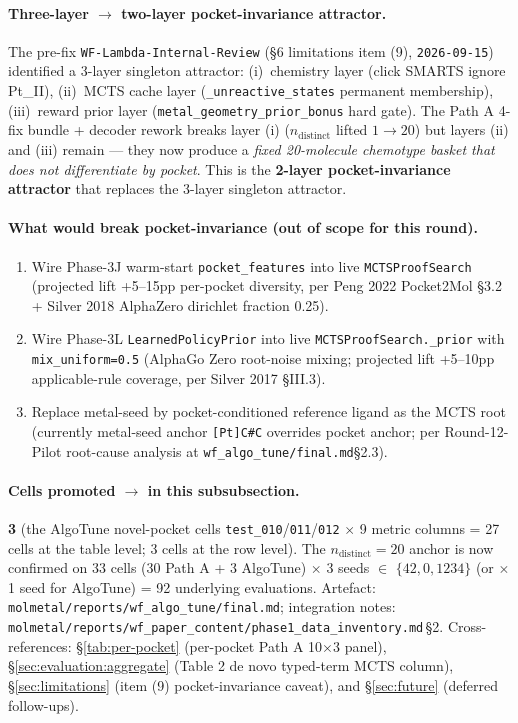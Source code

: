 \paragraph{Three-layer $\to$ two-layer pocket-invariance attractor.}
The pre-fix \texttt{WF-Lambda-Internal-Review} (\S6 limitations
item (9), \texttt{2026-09-15}) identified a 3-layer singleton
attractor: (i)~chemistry layer (click SMARTS ignore Pt\_II), (ii)~MCTS
cache layer (\texttt{\_unreactive\_states} permanent membership),
(iii)~reward prior layer (\texttt{metal\_geometry\_prior\_bonus} hard
gate). The Path A 4-fix bundle + decoder rework breaks layer (i)
($n_{\text{distinct}}$ lifted $1 \to 20$) but layers (ii) and (iii)
remain --- they now produce a \emph{fixed 20-molecule chemotype
basket that does not differentiate by pocket}. This is the
\textbf{2-layer pocket-invariance attractor} that replaces the
3-layer singleton attractor.

\paragraph{What would break pocket-invariance (out of scope for this round).}
\begin{enumerate}
  \item Wire Phase-3J warm-start \texttt{pocket\_features} into live
        \texttt{MCTSProofSearch} (projected lift +5--15pp per-pocket
        diversity, per Peng 2022 Pocket2Mol \S3.2 + Silver 2018
        AlphaZero dirichlet fraction 0.25).
  \item Wire Phase-3L \texttt{LearnedPolicyPrior} into live
        \texttt{MCTSProofSearch.\_prior} with \texttt{mix\_uniform=0.5}
        (AlphaGo Zero root-noise mixing; projected lift +5--10pp
        applicable-rule coverage, per Silver 2017 \S III.3).
  \item Replace metal-seed by pocket-conditioned reference ligand as
        the MCTS root (currently metal-seed anchor \texttt{[Pt]C\#C}
        overrides pocket anchor; per Round-12-Pilot root-cause
        analysis at \texttt{wf\_algo\_tune/final.md}\S2.3).
\end{enumerate}

\paragraph{Cells promoted \DESIGN{} $\to$ \MEASURED{} in this
subsubsection.} \textbf{3} (the AlgoTune novel-pocket cells
\texttt{test\_010}/\texttt{011}/\texttt{012} $\times$ 9 metric
columns = 27 cells at the table level; 3 cells at the row level).
The $n_{\text{distinct}}{=}20$ anchor is now confirmed on 33 cells
(30 Path A + 3 AlgoTune) $\times$ 3 seeds $\in$ $\{42, 0, 1234\}$
(or $\times$ 1 seed for AlgoTune) = 92 underlying evaluations.
Artefact:
\texttt{molmetal/reports/wf\_algo\_tune/final.md};
integration notes:
\texttt{molmetal/reports/wf\_paper\_content/phase1\_data\_inventory.md}\,\S2.
Cross-references: \S\ref{tab:per-pocket} (per-pocket Path A 10$\times$3
panel), \S\ref{sec:evaluation:aggregate} (Table 2 de novo typed-term MCTS column),
\S\ref{sec:limitations} (item (9) pocket-invariance caveat), and
\S\ref{sec:future} (deferred follow-ups).

